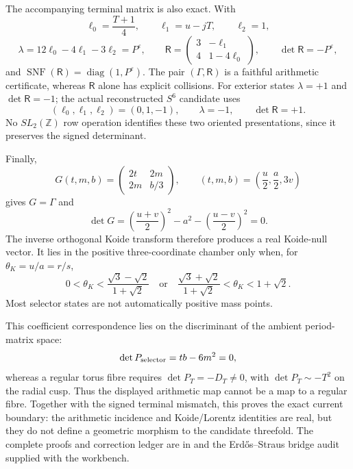 \documentclass[10pt,letterpaper]{article}
\begin{document}
The accompanying terminal matrix is also exact.  With
\[
 \ell_0=\frac{T+1}{4},\qquad \ell_1=u-jT,\qquad \ell_2=1,
\]
\[
 \lambda=12\ell_0-4\ell_1-3\ell_2=P^\varepsilon,\qquad
 \mathsf R=
 \begin{pmatrix}3&-\ell_1\\4&1-4\ell_0\end{pmatrix},\qquad
 \det\mathsf R=-P^\varepsilon,
\]
and \(\operatorname{SNF}(\mathsf R)=\operatorname{diag}(1,P^\varepsilon)\).
The pair \((\Gamma,\mathsf R)\) is a faithful arithmetic certificate,
whereas \(\mathsf R\) alone has explicit collisions.  For exterior states
\(\lambda=+1\) and \(\det\mathsf R=-1\); the actual reconstructed
\(S^6\) candidate uses
\[
 (\ell_0,\ell_1,\ell_2)=(0,1,-1),\qquad
 \lambda=-1,\qquad \det\mathsf R=+1.
\]
No \(SL_2(\mathbb Z)\) row operation identifies these two oriented
presentations, since it preserves the signed determinant.

Finally,
\[
 G(t,m,b)=\begin{pmatrix}2t&2m\\2m&b/3\end{pmatrix},\qquad
 (t,m,b)=\left(\frac u2,\frac a2,3v\right)
\]
gives \(G=\Gamma\) and
\[
 \det G=
 \left(\frac{u+v}{2}\right)^2-a^2-
 \left(\frac{u-v}{2}\right)^2=0.
\]
The inverse orthogonal Koide transform therefore produces a real Koide-null
vector.  It lies in the positive three-coordinate chamber only when, for
\(\theta_K=u/a=r/s\),
\[
 0<\theta_K<\frac{\sqrt3-\sqrt2}{1+\sqrt2}
 \quad\text{or}\quad
 \frac{\sqrt3+\sqrt2}{1+\sqrt2}<\theta_K<1+\sqrt2.
\]
Most selector states are not automatically positive mass points.

This coefficient correspondence lies on the discriminant of the ambient
period-matrix space:
\[
 \det P_{\rm selector}=tb-6m^2=0,
\]
whereas a regular torus fibre requires
\(\det P_T=-D_T\ne0\), with \(\det P_T\sim-T^2\) on the radial cusp.
Thus the displayed arithmetic map cannot be a map to a regular fibre.
Together with the signed terminal mismatch, this proves the exact current
boundary: the arithmetic incidence and Koide/Lorentz identities are real,
but they do not define a geometric morphism to the candidate threefold.
The complete proofs and correction ledger are in
 and the
Erd\H{o}s--Straus bridge audit supplied with the workbench.
\end{document}
